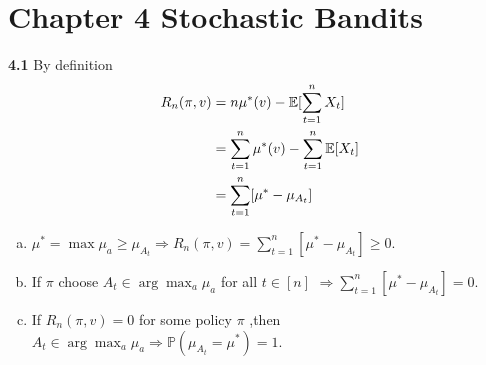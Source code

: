\chapter*{Chapter 4 Stochastic Bandits}
\label{sec:second}

\noindent\textbf{4.1}
By definition
\begin{align}
R_n(\pi,v) &=n\mu^*(v)-\mathbb{E}[\sum^n_{t=1}X_t]\notag\\
&=\sum^n_{t=1}\mu^*(v)-\sum^n_{t=1}\mathbb{E}[X_t]\notag\\
&=\sum^n_{t=1}[\mu^*-\mu_{A_t}]\notag
\end{align}
\begin{enumerate}[(a)]
    \item $\mu^*=\max\mu_a\ge\mu_{A_t} \Rightarrow R_n(\pi,v)=\sum^n_{t=1}[\mu^*-\mu_{A_t}]\ge0$.

    \item If $\pi$ choose $A_t \in \arg\max_a\mu_a$ for all $t\in[n]$ $\Rightarrow \sum^n_{t=1}[\mu^*-\mu_{A_t}]=0$.

\item If $R_n(\pi,v)=0$ for some policy $\pi$ ,then $A_t \in \arg\max_a\mu_a \Rightarrow \mathbb{P}(\mu_{A_t}=\mu^*)=1$.
\end{enumerate}

